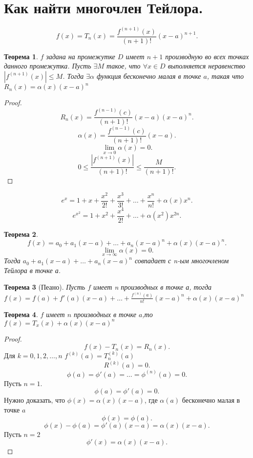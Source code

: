 \documentclass[a4paper]{scrartcl}
\newtheorem{theorem}{Теорема}
\begin{document}
\section{Как найти многочлен Тейлора.}
\[
    f(x) = T_n(x)  = \frac{f^{(n + 1)}(x)}{(n + 1)!} (x - a)^{n + 1}
.\] 
\begin{theorem}
    $f$ задана на промежутке  $D$ имеет  $n + 1$ производную во всех точках данного промежутка. Пусть  $\exists  M$ такое, что $\forall  x\in D$ выполняется неравенство $| f^{(n + 1)}(x) | \le  M$. Тогда  $\exists  \alpha$ функция бесконечно малая в точке $a$, такая что  $R_n(x) = \alpha(x)(x - a)^n$
\end{theorem}
\begin{proof}
    \[
        R_n(x)  = \frac{f^{(n - 1)}(c)}{(n + 1)!} (x - a) (x - a)^n
    .\] 
    \[
  \alpha(x) =  \frac{f^{(n - 1)}(c)}{(n + 1)!} (x - a)
    .\] 
    \[
    \lim_{x \to 0} \alpha(x) = 0
    .\] 
    \[
        0 \le \frac{|f^{( n + 1 )}(x)|}{(n + 1)!} \le  \frac{M}{( n + 1 )!}
    .\] 
\end{proof}
\[
e^x = 1 + x + \frac{x^2}{2!} +  \frac{x^3}{3!} + \dots + \frac{x^n}{n!} + \alpha(x)x^n
.\] 
\[
    e^{x^2}  = 1 + x^2 + \frac{x^4}{2!} + \dots + \alpha(x^2)x^{2n}
.\] 
\begin{theorem}
    \[
        f(x) = a_0 + a_1(x - a) + \dots + a_n(x - a)^n + \alpha(x)(x - a)^n
    .\] 
    \[
    \lim_{x \to \infty} \alpha(x) =  0
    .\] 
    Тогда $a_0 + a_1(x -a) + \dots + a_n(x - a)^n$ совпадает с n-ым многочленом Тейлора в точке а.
\end{theorem}
\begin{theorem}[Пеано]
    Пусть $f$  имеет n производных в точке а, тогда  $f(x) = f(a) + f'(a)(x - a) + \dots + \frac{f^{(n)}(a)}{n!}(x - a)^n + \alpha(x) (x - a)^n$
\end{theorem}
\begin{theorem}
    $f$ имеет  $n$ производных в точке  $a$,то  $f(x)  = T_x(x) + \alpha(x)(x - a )^n$
\end{theorem}
\begin{proof}
    \[
    f(x) - T_n(x) = R_n(x)
    .\] 
    Для $k = 0,1,2,\dots,n$ $ f^{(k)}(a) = T^{(k)}_n(a)$
    \[
        R^{(k)}(a) = 0
    .\] 
    \[
        \phi(a) = \phi'(a) = \dots = \phi^{(n)}(a) = 0 
    .\] 
    Пусть $n = 1$. 
    \[
    \phi(a) = \phi'(a) = 0
    .\] 
    Нужно доказать, что $\phi(x) =  \alpha(x)(x - a)$, где  $\alpha(a)$ бесконечно малая в точке  $a$
    \[
    \phi(x) = \phi(a) 
    .\] 
     \[
    \phi(x) - \phi(a) = \phi'(a)(x - a) = \alpha(x)(x - a)
    .\] 
    Пусть $n = 2$
    \[
   \phi'(x)  = \alpha(x)(x - a)
    .\] 
\end{proof}
\end{document}
